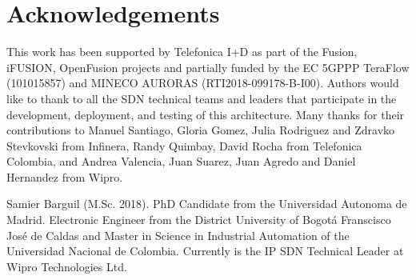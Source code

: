 \documentclass[10pt, conference]{IEEEtran}
\begin{document}

\section*{Acknowledgements}
This  work has been supported by Telefonica I+D as part of the Fusion, i\uppercase{FUSION}, OpenFusion projects and partially funded by the EC 5GPPP TeraFlow (101015857) and MINECO AURORAS (RTI2018-099178-B-I00). Authors would like to thank to all the SDN technical teams and leaders that participate in the development, deployment, and testing of this  architecture. Many thanks for their contributions to Manuel Santiago, Gloria Gomez, Julia Rodriguez and Zdravko Stevkovski from Infinera, Randy Quimbay, David Rocha from Telefonica Colombia, and Andrea Valencia, Juan Suarez, Juan Agredo and Daniel Hernandez from Wipro.   

%



\begin{IEEEbiography}
%
{Samier Barguil} (M.Sc. 2018). PhD Candidate from the Universidad Autonoma de Madrid. Electronic Engineer from the District University of Bogot\'a Franscisco José de Caldas and Master in Science in Industrial Automation of the Universidad Nacional de Colombia. Currently is the IP SDN Technical Leader at Wipro Technologies Ltd.\end{IEEEbiography}
\end{document}
